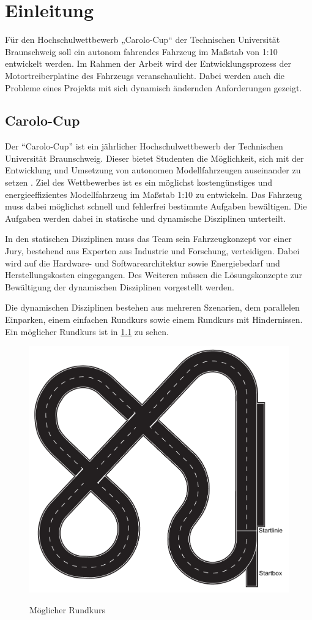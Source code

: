 \chapter{Einleitung}

Für den Hochschulwettbewerb „Carolo-Cup“ der Technischen Universität Braunschweig soll ein autonom fahrendes Fahrzeug im Maßstab von 1:10
entwickelt werden. Im Rahmen der Arbeit wird der Entwicklungsprozess der Motortreiberplatine des Fahrzeugs veranschaulicht.
Dabei werden auch die Probleme eines Projekts mit sich dynamisch ändernden Anforderungen gezeigt. 


\section{Carolo-Cup}
Der ``Carolo-Cup'' ist ein jährlicher Hochschulwettbewerb der Technischen Universität Braunschweig. Dieser bietet Studenten die Möglichkeit, sich mit der Entwicklung 
und Umsetzung von autonomen Modellfahrzeugen auseinander zu setzen \cite{website-carolo-cup}. Ziel des Wettbewerbes ist es ein möglichst kostengünstiges
und energieeffizientes Modellfahrzeug im Maßstab 1:10 zu entwickeln. Das Fahrzeug muss dabei möglichst schnell und fehlerfrei bestimmte Aufgaben
bewältigen. Die Aufgaben werden dabei in statische und dynamische Disziplinen unterteilt. 

In den statischen Disziplinen muss das Team sein Fahrzeugkonzept vor einer Jury, bestehend aus Experten aus Industrie und Forschung, verteidigen.
Dabei wird auf die Hardware- und Softwarearchitektur sowie Energiebedarf und Herstellungskosten eingegangen. Des Weiteren müssen die Lösungskonzepte
zur Bewältigung der dynamischen Disziplinen vorgestellt werden.

Die dynamischen Disziplinen bestehen aus mehreren Szenarien, dem parallelen Einparken, einem einfachen Rundkurs sowie einem Rundkurs mit Hindernissen.
Ein möglicher Rundkurs ist in \cref{fig:Rundkurs} zu sehen.

\begin{figure}[H]
\centering
\includegraphics[width=.8\textwidth]{Strecke.png}\\
\caption{Möglicher Rundkurs \cite{website-carolo-cup-regelwerk}}
\label{fig:Rundkurs}
\end{figure}

